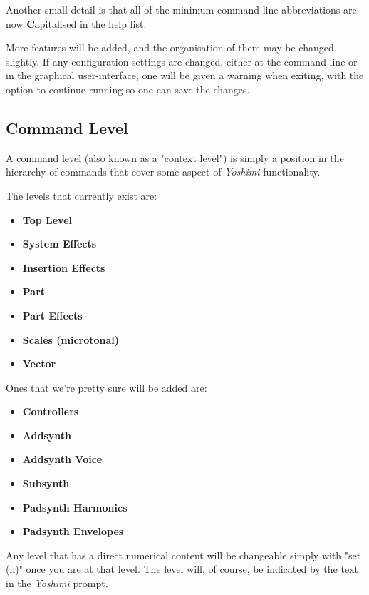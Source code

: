    Another small detail is that all of the minimum command-line
   abbreviations are now \textbf{C}apitalised in the help list.     

   More features will be added, and the organisation of them may be changed
   slightly.  If any configuration settings are changed, either at the
   command-line or in the graphical user-interface, one will be given a warning
   when exiting, with the option to continue running so one can save the
   changes.

\subsection{Command Level}
\label{subsec:command_line_command_level}

   A command level
   (also known as a "context level")
   is simply a position in the hierarchy of commands that cover
   some aspect of \textsl{Yoshimi} functionality.

   The levels that currently exist are:

   \begin{itemize}
      \item \textbf{Top Level}
      \item \textbf{System Effects}
      \item \textbf{Insertion Effects}
      \item \textbf{Part}
      \item \textbf{Part Effects}
      \item \textbf{Scales (microtonal)}
      \item \textbf{Vector}
   \end{itemize}

Ones that we're pretty sure will be added are:

   \begin{itemize}
      \item \textbf{Controllers}
      \item \textbf{Addsynth}
      \item \textbf{Addsynth Voice}
      \item \textbf{Subsynth}
      \item \textbf{Padsynth Harmonics}
      \item \textbf{Padsynth Envelopes}
   \end{itemize}

   Any level that has a direct numerical content will be changeable simply with
   "set (n)" once you are at that level.  The level will, of course, be
   indicated by the text in the \textsl{Yoshimi} prompt.

